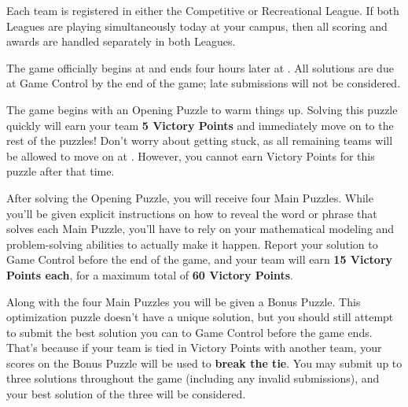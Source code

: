 
\begin{multicols}{2}

Each team is registered in either the Competitive or Recreational League.
If both Leagues are playing simultaneously today at your campus, then all
scoring and awards are handled separately in both Leagues.


The game officially begins at \underline{\hspace{5em}} and ends
four hours later at \underline{\hspace{5em}}. All solutions are due at
Game Control by the end of the game; late submissions will not be considered.


The game begins with an Opening Puzzle to warm things up. Solving this
puzzle quickly will earn your team \textbf{5 Victory Points} and
immediately move on to the rest of the puzzles!
Don't worry about getting stuck, as all remaining
teams will be allowed to move on
at \underline{\hspace{5em}}. However, you cannot earn Victory Points for
this puzzle after that time.


After solving the Opening Puzzle, you will receive four
Main Puzzles. While you'll be given explicit instructions on how to
reveal the word or phrase that solves each Main Puzzle, you'll have to
rely on your mathematical modeling and problem-solving abilities to actually
make it happen. Report your solution to Game Control before the end of
the game, and your team will earn \textbf{15 Victory Points each},
for a maximum total of \textbf{60 Victory Points}.


Along with the four Main Puzzles you will be given a Bonus Puzzle. This
optimization puzzle doesn't have a unique solution, but you should still
attempt to submit the best solution you can to Game Control before the
game ends. That's because if your team is tied in
Victory Points with another team, your scores on the Bonus Puzzle will be used
to \textbf{break the tie}. You may submit up to three solutions throughout
the game (including any invalid submissions), and your best solution of the
three will be considered.


\end{multicols}

